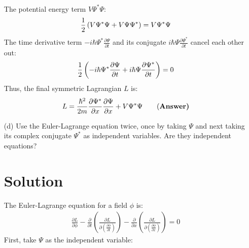 \begin{enumerate}
\begin{align}
    \end{align}
    The potential energy term $V\Psi^*\Psi$:
    \begin{align}
        \frac{1}{2} \left( V\Psi^*\Psi + V\Psi\Psi^* \right) = V\Psi^*\Psi\notag
    \end{align}
    The time derivative term $\displaystyle-i\hbar \Psi^* \frac{\partial \Psi}{\partial t}$ and its conjugate $\displaystyle i\hbar \Psi \frac{\partial \Psi^*}{\partial t}$ cancel each other out:
    \begin{align}
        \frac{1}{2} \left( -i\hbar \Psi^* \frac{\partial \Psi}{\partial t} + i\hbar \Psi \frac{\partial \Psi^*}{\partial t} \right) = 0\notag
    \end{align}
    Thus, the final symmetric Lagrangian $L$ is:
    \begin{align}
        L = \frac{\hbar^2}{2m} \frac{\partial \Psi^*}{\partial x} \frac{\partial \Psi}{\partial x} + V\Psi^*\Psi \qquad\text{(\bf Answer)}\notag
    \end{align}
    \bigskip\bigskip\hline\hline\bigskip
    \item[(d)] Use the Euler-Lagrange equation twice, once by taking $\Psi$ and next taking its complex conjugate $\Psi^*$ as independent variables. Are they independent equations?
    \bigskip\bigskip\hline\hline\bigskip
    \section*{Solution}
    The Euler-Lagrange equation for a field $\phi$ is:
    \begin{align}
        \frac{\partial L}{\partial \phi} - \frac{\partial}{\partial t} \left( \frac{\partial L}{\displaystyle\partial \left(\frac{\partial \phi}{\partial t}\right)} \right) - \frac{\partial}{\partial x} \left( \frac{\partial L}{\displaystyle\partial \left(\frac{\partial \phi}{\partial x}\right)} \right) = 0
    \end{align}
    First, take $\Psi$ as the independent variable:
    

\end{enumerate}
